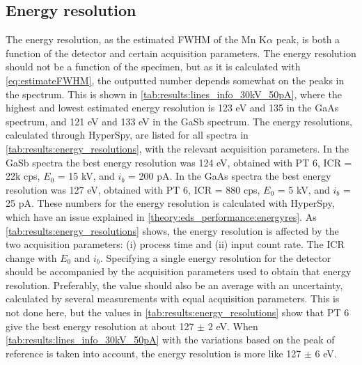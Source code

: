 


\subsection{Energy resolution} %
\label{results:energy_resolution}

The energy resolution, as the estimated FWHM of the Mn K$\alpha$ peak, is both a function of the detector and certain acquisition parameters.
The energy resolution should not be a function of the specimen, but as it is calculated with \cref{eq:estimateFWHM}, the outputted number depends somewhat on the peaks in the spectrum.
This is shown in \cref{tab:results:lines_info_30kV_50pA}, where the highest and lowest estimated energy resolution is 123 eV and 135 in the GaAs spectrum, and 121 eV and 133 eV in the GaSb spectrum.
The energy resolutions, calculated through HyperSpy, are listed for all spectra in \cref{tab:results:energy_resolutions}, with the relevant acquisition parameters.
In the GaSb spectra the best energy resolution was 124 eV, obtained with PT 6, ICR = 22k cps, $E_0$ = 15 kV, and $i_b$ = 200 pA.
In the GaAs spectra the best energy resolution was 127 eV, obtained with PT 6, ICR = 880 cps, $E_0$ = 5 kV, and $i_b$ = 25 pA.
These numbers for the energy resolution is calculated with HyperSpy, which have an issue explained in \cref{theory:eds_performance:energyres}.
As \cref{tab:results:energy_resolutions} shows, the energy resolution is affected by the two acquisition parameters: (i) process time and (ii) input count rate.
The ICR change with $E_0$ and $i_b$.
Specifying a single energy resolution for the detector should be accompanied by the acquisition parameters used to obtain that energy resolution.
Preferably, the value should also be an average with an uncertainty, calculated by several measurements with equal acquisition parameters.
This is not done here, but the values in \cref{tab:results:energy_resolutions} show that PT 6 give the best energy resolution at about 127 $\pm$ 2 eV.
When \cref{tab:results:lines_info_30kV_50pA} with the variations based on the peak of reference is taken into account, the energy resolution is more like 127 $\pm$ 6 eV.



